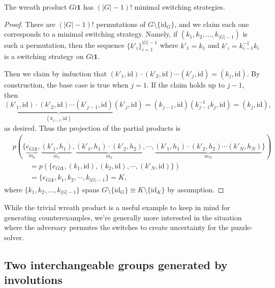 \begin{proposition}
  The wreath product $G \wr \mathbf{1}$ has $(|G|-1)!$ minimal switching
  strategies.
  \label{prop:countingTrivialSS}
\end{proposition}
\begin{proof}
  There are $(|G| - 1)!$ permutations of $G \setminus \{\mathrm{id}_G\}$, and
  we claim each one corresponds to a minimal switching strategy. Namely,
  if $(k_1, k_2, \dots, k_{|G|-1})$ is such a permutation, then
  the sequence $\{k'_i\}_{i=1}^{|G|-1}$ where $k'_1 = k_1$ and
  $k'_i = k_{i-1}^{-1}k_i$ is a switching strategy on $G \wr \mathbf{1}$.

  Then we claim by induction that
  $(k'_1, \mathrm{id})\cdot(k'_2, \mathrm{id})\cdots(k'_j, \mathrm{id}) = (k_j, \mathrm{id})$.
  By construction, the base case is true when $j = 1$. If the claim holds up to
  $j-1$, then \[
    \underbrace{
      (k'_1, \mathrm{id})\cdot(k'_2, \mathrm{id})\cdots(k'_{j-1}, \mathrm{id})
    }_{(k_{j-1}, \mathrm{id})}
    (k'_j, \mathrm{id})
    = (k_{j-1}, \mathrm{id})(k_{j-1}^{-1}k_j, \mathrm{id})
    = (k_j, \mathrm{id}),
  \] as desired.
  Thus the projection of the partial products is
  \begin{align}
    &p(\{
      \underbrace{e_{G \wr \mathbf{1}}}_{m_0},
      \underbrace{(k'_1, h_1)}_{m_1},
      \underbrace{(k'_1, h_1)\cdot(k'_2, h_2)}_{m_2},
      \cdots,
      \underbrace{(k'_1, h_1)\cdot(k'_2, h_2)\cdots(k'_N, h_N)}_{m_N}
    \}) \\
    & \hspace{1cm} =
    p(\{
      e_{G \wr \mathbf{1}},
      (k_1, \mathrm{id}),
      (k_2, \mathrm{id}),
      \cdots,
      (k'_N, \mathrm{id})
    \}) \\
    & \hspace{1cm} = \{e_{G \wr \mathbf{1}}, k_1, k_2, \cdots,k_{|G|-1}\} = K,
  \end{align}
  where $\{k_1, k_2, \dots, k_{|G|-1}\}$ spans
  $G \setminus \{\mathrm{id}_G\} \cong K \setminus \{\mathrm{id}_K\}$ by
  assumption.
\end{proof}

While the trivial wreath product is a useful example to keep in mind for
generating counterexamples, we're generally more interested in the situation
where the adversary permutes the switches to create uncertainty for the
puzzle-solver.

\subsection{Two interchangeable groups generated by involutions}

